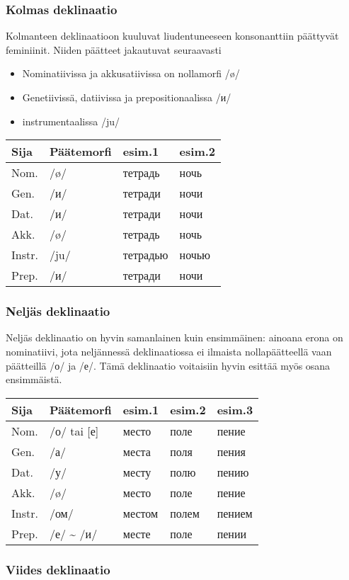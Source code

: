 \documentclass[]{scrartcl}
\providecommand{\tightlist}{%
  \setlength{\itemsep}{0pt}\setlength{\parskip}{0pt}}
\begin{document}
\subsubsection{Kolmas deklinaatio}\label{kolmas-deklinaatio}

Kolmanteen deklinaatioon kuuluvat liudentuneeseen konsonanttiin
päättyvät feminiinit. Niiden päätteet jakautuvat seuraavasti

\begin{itemize}
\tightlist
\item
  Nominatiivissa ja akkusatiivissa on nollamorfi /ø/
\item
  Genetiivissä, datiivissa ja prepositionaalissa /и/
\item
  instrumentaalissa /ju/
\end{itemize}

\begin{longtable}[c]{@{}llll@{}}
\toprule
Sija & Päätemorfi & esim.1 & esim.2\tabularnewline
\midrule
\endhead
Nom. & /ø/ & тетрадь & ночь\tabularnewline
Gen. & /и/ & тетради & ночи\tabularnewline
Dat. & /и/ & тетради & ночи\tabularnewline
Akk. & /ø/ & тетрадь & ночь\tabularnewline
Instr. & /ju/ & тетрадью & ночью\tabularnewline
Prep. & /и/ & тетради & ночи\tabularnewline
\bottomrule
\end{longtable}

\subsubsection{Neljäs deklinaatio}\label{neljuxe4s-deklinaatio}

Neljäs deklinaatio on hyvin samanlainen kuin ensimmäinen: ainoana erona
on nominatiivi, jota neljännessä deklinaatiossa ei ilmaista
nollapäätteellä vaan päätteillä /о/ ja /е/. Tämä deklinaatio voitaisiin
hyvin esittää myös osana ensimmäistä.

\begin{longtable}[c]{@{}lllll@{}}
\toprule
Sija & Päätemorfi & esim.1 & esim.2 & esim.3\tabularnewline
\midrule
\endhead
Nom. & /о/ tai {[}е{]} & место & поле & пение\tabularnewline
Gen. & /а/ & места & поля & пения\tabularnewline
Dat. & /у/ & месту & полю & пению\tabularnewline
Akk. & /ø/ & место & поле & пение\tabularnewline
Instr. & /ом/ & местом & полем & пением\tabularnewline
Prep. & /е/ \textasciitilde{} /и/ & месте & поле & пении\tabularnewline
\bottomrule
\end{longtable}

\subsubsection{Viides deklinaatio}\label{viides-deklinaatio}
\end{document}
